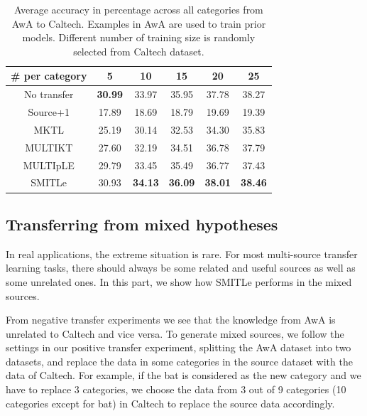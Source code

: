 \begin{table}[htbp]
  \centering
  \caption{Average accuracy in percentage across all categories from AwA to Caltech. Examples in AwA are used to train prior models. Different number of training size is randomly selected from Caltech dataset.}
    \begin{tabular}{|c|c|c|c|c|c|}
    \hline
      \# per category           & 5              & 10             & 15             & 20             & 25             \\
    \hline
    No transfer &         \textbf{ 30.99 } &         33.97  &         35.95 &         37.78  &         38.27   \\
    Source+1    &         17.89  &         18.69  &         18.79  &         19.69  &         19.39          \\
    MKTL        &         25.19  &         30.14  &         32.53  &         34.30  &         35.83  \\
    MULTIKT     &         27.60  &         32.19  &         34.51  &         36.78  &         37.79  \\
    MULTIpLE    &         29.79  &         33.45  &         35.49  &         36.77  &         37.43  \\
    SMITLe        &       30.93  &         \textbf{ 34.13 } &         \textbf{  36.09 } &         \textbf{38.01} &         \textbf{38.46} \\
    \hline
    \end{tabular}%
  \label{tab:A2C}%
\end{table}%

\subsection{Transferring from mixed hypotheses}
In real applications, the extreme situation is rare. For most multi-source transfer learning tasks, there should always be some related and useful sources as well as some unrelated ones. In this part, we show how SMITLe performs in the mixed sources.

From negative transfer experiments we see that the knowledge from AwA is unrelated to Caltech and vice versa. To generate mixed sources, we follow the settings in our positive transfer experiment, splitting the AwA dataset into two datasets, and replace the data in some categories in the source dataset with the data of Caltech. 
For example, if the bat is considered as the new category and we have to replace 3 categories, we choose the data from 3 out of 9 categories (10 categories except for bat) in Caltech to replace the source data accordingly. 

